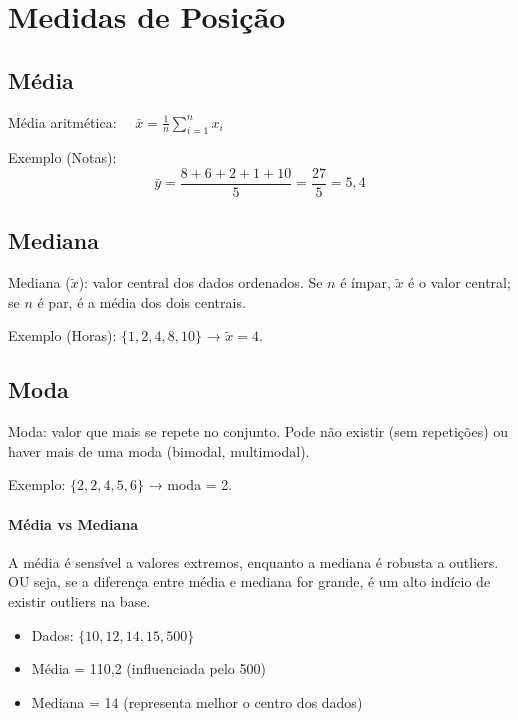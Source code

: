 \section{Medidas de Posição}

\subsection*{Média}
\begin{FormulaBox}
Média aritmética: $\quad \bar{x} = \frac{1}{n}\sum_{i=1}^{n}x_i$
\end{FormulaBox}

Exemplo (Notas):  
\[
\bar{y} = \frac{8+6+2+1+10}{5} = \frac{27}{5} = 5{,}4
\]

\subsection*{Mediana}
\begin{FormulaBox}
Mediana ($\tilde{x}$): valor central dos dados ordenados.  
Se $n$ é ímpar, $\tilde{x}$ é o valor central; se $n$ é par, é a média dos dois centrais.
\end{FormulaBox}

Exemplo (Horas): $\{1,2,4,8,10\}$ → $\tilde{x}=4$.

\subsection*{Moda}
\begin{FormulaBox}
Moda: valor que mais se repete no conjunto.  
Pode não existir (sem repetições) ou haver mais de uma moda (bimodal, multimodal).
\end{FormulaBox}

Exemplo: $\{2,2,4,5,6\}$ → moda = 2.

\paragraph{Média vs Mediana}
A média é sensível a valores extremos, enquanto a mediana é robusta a outliers.  OU seja, se a diferença entre média e mediana for grande, é um alto indício de existir outliers na base.
\begin{itemize}
  \item Dados: $\{10,12,14,15,500\}$  
  \item Média = 110,2 (influenciada pelo 500)  
  \item Mediana = 14 (representa melhor o centro dos dados)  
\end{itemize}

